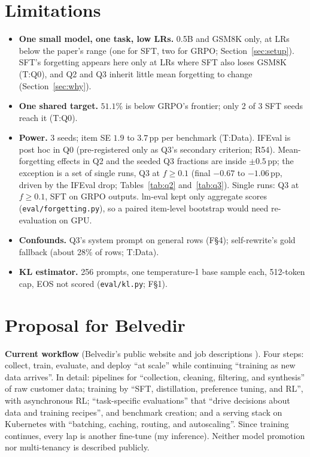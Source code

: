 \documentclass[11pt]{article}
\newcommand{\pp}{\,pp\xspace}
\newcommand{\T}[1]{\textsf{T:#1}}
\newcommand{\F}[1]{\textsf{F\S#1}}
\begin{document}
\section{Limitations}
\label{sec:limits}
\begin{itemize}
\item \textbf{One small model, one task, low LRs.} 0.5B and GSM8K only, at LRs below the paper's range (one for SFT,
  two for GRPO; Section~\ref{sec:setup}). SFT's forgetting appears here only at LRs where
  SFT also loses GSM8K (\T{Q0}), and Q2 and Q3 inherit little mean forgetting to change (Section~\ref{sec:why}).
\item \textbf{One shared target.} $51.1$\% is below GRPO's frontier; only 2 of 3 SFT seeds reach it (\T{Q0}).
\item \textbf{Power.} 3 seeds; item SE $1.9$ to $3.7$\pp per benchmark (\T{Data}). IFEval is post hoc in Q0
  (pre-registered only as Q3's secondary criterion; R54). Mean-forgetting effects in Q2 and the seeded Q3 fractions
  are inside $\pm 0.5$\pp; the exception is a set of single runs, Q3 at $f \ge 0.1$ (final $-0.67$ to $-1.06$\pp,
  driven by the IFEval drop; Tables~\ref{tab:q2} and~\ref{tab:q3}). Single runs: Q3 at $f \ge 0.1$, SFT on GRPO
  outputs. lm-eval kept only aggregate scores (\texttt{eval/forgetting.py}), so a paired item-level bootstrap would
  need re-evaluation on GPU.
\item \textbf{Confounds.} Q3's system prompt on general rows (\F{4}); self-rewrite's gold fallback (about 28\% of
  rows; \T{Data}).
\item \textbf{KL estimator.} 256 prompts, one temperature-1 base sample each, 512-token cap, EOS not scored
  (\texttt{eval/kl.py}; \F{1}).
\end{itemize}

\section{Proposal for Belvedir}
\label{sec:proposal}
\textbf{Current workflow} (Belvedir's public website and job descriptions \cite{belvedir}). Four steps:
collect, train, evaluate, and deploy ``at scale'' while continuing ``training as new data arrives''. In detail:
pipelines for ``collection, cleaning, filtering, and synthesis'' of raw customer data;
training by ``SFT, distillation, preference tuning, and RL'', with asynchronous RL; ``task-specific evaluations''
that ``drive decisions about data and training recipes'', and benchmark creation; and a serving stack on Kubernetes
with ``batching, caching, routing, and autoscaling''. Since training continues, every lap is another fine-tune (my inference).
Neither model promotion nor multi-tenancy is described publicly.
\end{document}
